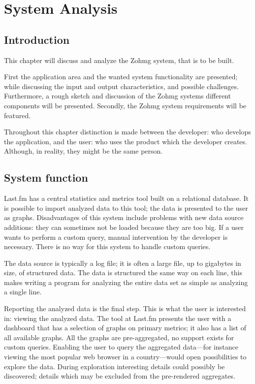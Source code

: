\chapter{System Analysis}



\section*{Introduction}

This chapter will discuss and analyze the Zohmg system, that is to be built.

First the application area and the wanted system functionality are presented;
while discussing the input and output characteristics, and possible challenges.
Furthermore, a rough sketch and discussion of the Zohmg systems different
components will be presented. Secondly, the Zohmg system requirements will be
featured.

Throughout this chapter distinction is made between the developer: who develops
the application, and the user: who uses the product which the developer
creates. Although, in reality, they might be the same person.


\section{System function}

Last.fm has a central statistics and metrics tool built on a relational
database. It is possible to import analyzed data to this tool; the data is
presented to the user as graphs. Disadvantages of this system include problems
with new data source additions: they can sometimes not be loaded because they
are too big. If a user wants to perform a custom query, manual intervention by
the developer is necessary. There is no way for this system to handle custom
queries.

The data source is typically a log file; it is often a large file, up to
gigabytes in size, of structured data. The data is structured the same way on
each line, this makes writing a program for analyzing the entire data set as
simple as analyzing a single line.

Reporting the analyzed data is the final step. This is what the user is
interested in: viewing the analyzed data. The tool at Last.fm presents the user
with a dashboard that has a selection of graphs on primary metrics; it also has
a list of all available graphs. All the graphs are pre-aggregated, no support
exists for custom queries. Enabling the user to query the aggregated data---for
instance viewing the most popular web browser in a country---would open
possibilities to explore the data. During exploration interesting details could
possibly be discovered; details which may be excluded from the pre-rendered
aggregates.

